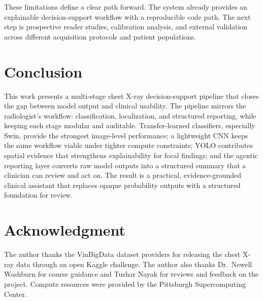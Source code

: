 \documentclass[conference]{IEEEtran}
\begin{document}
These limitations define a clear path forward. The system already provides an explainable decision-support workflow with a reproducible code path. The next step is prospective reader studies, calibration analysis, and external validation across different acquisition protocols and patient populations.

\section{Conclusion}
This work presents a multi-stage chest X-ray decision-support pipeline that closes the gap between model output and clinical usability. The pipeline mirrors the radiologist's workflow: classification, localization, and structured reporting, while keeping each stage modular and auditable. Transfer-learned classifiers, especially Swin, provide the strongest image-level performance; a lightweight CNN keeps the same workflow viable under tighter compute constraints; YOLO contributes spatial evidence that strengthens explainability for focal findings; and the agentic reporting layer converts raw model outputs into a structured summary that a clinician can review and act on. The result is a practical, evidence-grounded clinical assistant that replaces opaque probability outputs with a structured foundation for review.

\section*{Acknowledgment}
The author thanks the VinBigData dataset providers for releasing the chest X-ray data through an open Kaggle challenge. The author also thanks Dr.\ Newell Washburn for course guidance and Tushar Nayak for reviews and feedback on the project. Compute resources were provided by the Pittsburgh Supercomputing Center.
\end{document}
